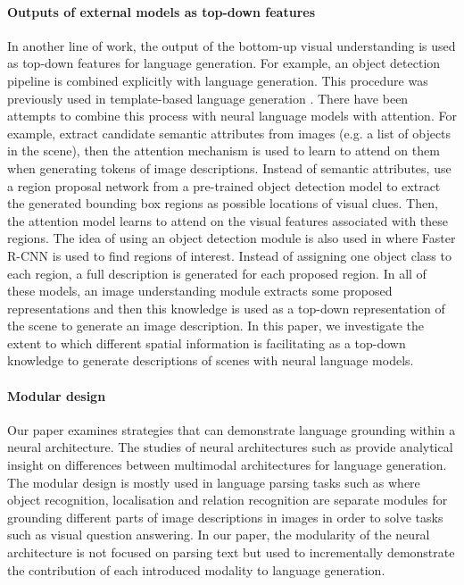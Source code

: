 \paragraph{Outputs of external models as top-down features} In another
line of work, the output of the bottom-up visual understanding is used
as top-down features for language generation. For example, an object
detection pipeline is combined explicitly with language
generation. This procedure was previously used in template-based
language generation \cite{elliott2013image,elliott2015describing}. There have been
attempts to combine this process with neural language models with
attention. For example, \citet{you2016image} extract candidate
semantic attributes from images (e.g. a list of objects in the scene),
then the attention mechanism is used to learn to attend
on %
them when generating tokens of image descriptions.  Instead of
semantic attributes, \citet{anderson2018bottom} use a region proposal
network from a pre-trained object detection model to extract the
generated bounding box regions as possible locations of visual
clues. Then, the attention model learns to attend on the visual
features associated with these regions. The idea of using an object
detection module is also used in \citet{johnson2016densecap} %
where Faster R-CNN \cite{ren2015faster} is used to find regions of
interest. Instead of assigning one object class to each region, a full
description is generated for each proposed region.  In all of these
models, an image understanding module extracts some proposed
representations and then this knowledge is used as a top-down
representation of the scene to generate an image description.  In this
paper, we investigate the extent to which different spatial
information is facilitating as a top-down knowledge to generate
descriptions of scenes with neural language
models. %

\paragraph{Modular design} %
Our paper examines strategies that can demonstrate 
language grounding within a neural architecture. The studies of neural
architectures such as \cite{tanti2018put} provide analytical insight
on differences between multimodal architectures for language
generation.  
The modular design is mostly used in language parsing
tasks such as \cite{hu2017modeling} where object recognition,
localisation and relation recognition are separate modules for
grounding different parts of image descriptions in images in order to
solve tasks such as visual question answering.  In our paper, the
modularity of the neural architecture is not focused on parsing text
but used to incrementally demonstrate the contribution of each
introduced modality to language generation.


